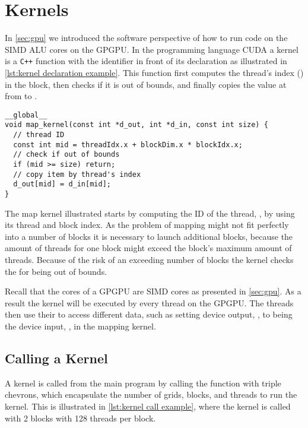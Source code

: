 \section{Kernels}
\label{sec:kernels}

In \cref{sec:gpu} we introduced the software perspective of how to run code on the SIMD ALU cores on the GPGPU.
In the programming language CUDA a kernel is a \verb!C++! function with the  identifier in front of its declaration as illustrated in \cref{lst:kernel declaration example}.
This function first computes the thread's index () in the block, then checks if it is out of bounds, and finally copies the value at  from  to .

\begin{lstlisting}[caption={Kernel declaration example}, label={lst:kernel declaration example}]
__global__
void map_kernel(const int *d_out, int *d_in, const int size) {
  // thread ID
  const int mid = threadIdx.x + blockDim.x * blockIdx.x;
  // check if out of bounds
  if (mid >= size) return;
  // copy item by thread's index
  d_out[mid] = d_in[mid];
}
\end{lstlisting}

The map kernel illustrated starts by computing the ID of the thread, , by using its thread and block index.
As the problem of mapping might not fit perfectly into a number of blocks it is necessary to launch additional blocks, because the amount of threads for one block might exceed the block's maximum amount of threads.
Because of the risk of an exceeding number of blocks the kernel checks the  for being out of bounds.

Recall that the cores of a GPGPU are SIMD cores as presented in \cref{sec:gpu}.
As a result the kernel will be executed by every thread on the GPGPU.
The threads then use their  to access different data, such as setting device output, , to being the device input, , in the mapping kernel.

\subsection{Calling a Kernel}
\label{sec:calling a kernel}

A kernel is called from the main program by calling the function with triple chevrons, which encapsulate the number of grids, blocks, and threads to run the kernel.
This is illustrated in \cref{lst:kernel call example}, where the kernel is called with 2 blocks with 128 threads per block.


